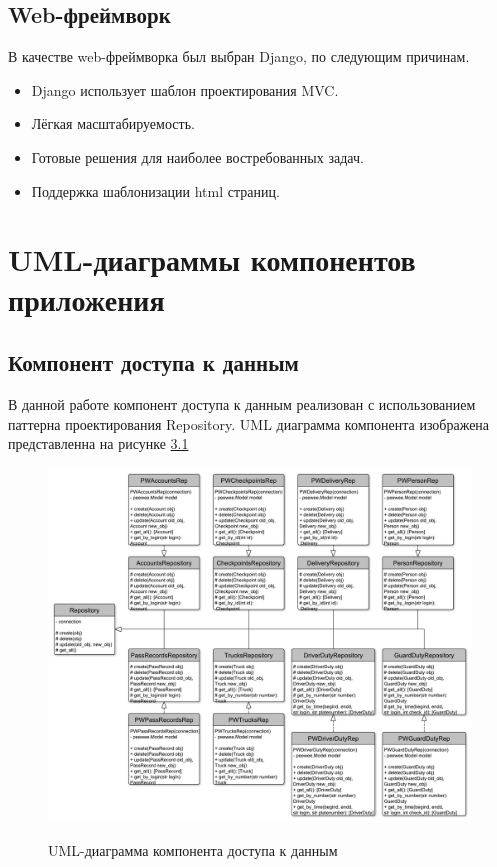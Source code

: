 \subsection{Web-фреймворк}
В качестве web-фреймворка был выбран Django, по следующим причинам.
\begin{itemize}
	\item Django использует шаблон проектирования MVC.
	\item Лёгкая масштабируемость.
	\item Готовые решения для наиболее востребованных задач.
	\item Поддержка шаблонизации html страниц.
\end{itemize}


\newpage
\section{UML-диаграммы компонентов приложения}
\subsection{Компонент доступа к данным}
В данной работе компонент доступа к данным реализован с использованием паттерна проектирования Repository. UML диаграмма компонента изображена представленна на рисунке \hyperref[rep_pic]{3.1}  

\begin{figure}[h!] \label{rep_pic}
	\begin{center}
		{\includegraphics[scale=0.4, angle=0]{uml/repsoitory.pdf}}
		\caption{UML-диаграмма компонента доступа к данным}
	\end{center}
\end{figure}

